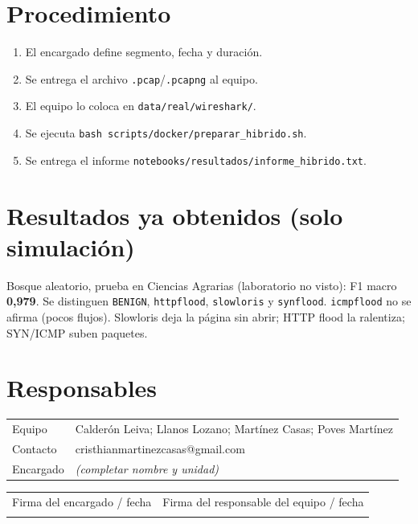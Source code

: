 \documentclass[11pt,a4paper]{article}
\begin{document}
\section{Procedimiento}
\begin{enumerate}[leftmargin=*]
  \item El encargado define segmento, fecha y duraci\'on.
  \item Se entrega el archivo \texttt{.pcap}/\texttt{.pcapng} al equipo.
  \item El equipo lo coloca en \texttt{data/real/wireshark/}.
  \item Se ejecuta \texttt{bash scripts/docker/preparar\_hibrido.sh}.
  \item Se entrega el informe
        \texttt{notebooks/resultados/informe\_hibrido.txt}.
\end{enumerate}

\section{Resultados ya obtenidos (solo simulaci\'on)}
Bosque aleatorio, prueba en Ciencias Agrarias (laboratorio no visto):
F1 macro \textbf{0,979}. Se distinguen \texttt{BENIGN},
\texttt{httpflood}, \texttt{slowloris} y \texttt{synflood}.
\texttt{icmpflood} no se afirma (pocos flujos). Slowloris deja la
p\'agina sin abrir; HTTP flood la ralentiza; SYN/ICMP suben paquetes.

\section{Responsables}
\begin{tabularx}{\textwidth}{@{}lX@{}}
\toprule
Equipo & Calder\'on Leiva; Llanos Lozano; Mart\'inez Casas; Poves Mart\'inez \\
Contacto & cristhianmartinezcasas@gmail.com \\
Encargado & \textit{(completar nombre y unidad)} \\
\bottomrule
\end{tabularx}

\vspace{1.5em}
\begin{tabularx}{\textwidth}{@{}X X@{}}
\toprule
Firma del encargado / fecha & Firma del responsable del equipo / fecha \\
\vspace{2.2cm} & \\
\bottomrule
\end{tabularx}
\end{document}
